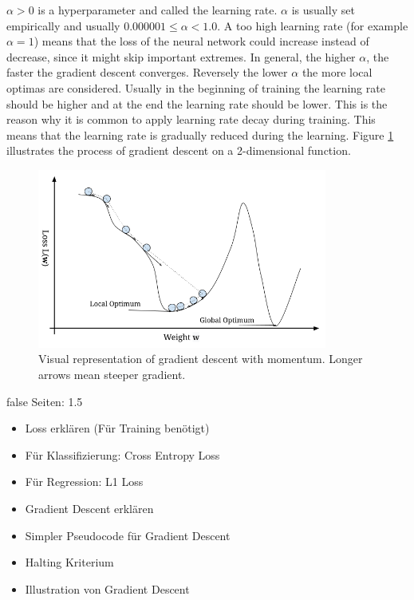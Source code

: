 \documentclass[draft,final,oneside]{vutinfth} %
\begin{document}
$\alpha > 0$ is a hyperparameter and called the learning rate. $\alpha$ is usually set empirically and usually $0.000001 \leq \alpha < 1.0$. A too high learning rate (for example $\alpha = 1$) means that the loss of the neural network could increase instead of decrease, since it might skip important extremes. In general, the higher $\alpha$, the faster the gradient descent converges. Reversely the lower $\alpha$ the more local optimas are considered. Usually in the beginning of training the learning rate should be higher and at the end the learning rate should be lower. This is the reason why it is common to apply learning rate decay during training. This means that the learning rate is gradually reduced during the learning. Figure \ref{fig:gradientdescent} illustrates the process of gradient descent on a 2-dimensional function.

\begin{figure}[ht]
	\centering
  	\includegraphics[width=0.85\textwidth]{graphics/gradientdescent.png}
	\caption{Visual representation of gradient descent with momentum. Longer arrows mean steeper gradient.}
	\label{fig:gradientdescent}
\end{figure}

\if false
Seiten: 1.5
\begin{itemize}
\item Loss erklären (Für Training benötigt)
\item Für Klassifizierung: Cross Entropy Loss
\item Für Regression: L1 Loss
\item Gradient Descent erklären
\item Simpler Pseudocode für Gradient Descent
\item Halting Kriterium
\item Illustration von Gradient Descent

\end{itemize}
\fi
\end{document}
